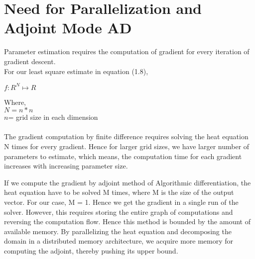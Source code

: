 \documentclass[10pt,a4paper]{report}
\begin{document}
\section{Need for Parallelization and Adjoint Mode AD}
Parameter estimation requires the computation of gradient for every iteration of gradient descent.\\
For our least square estimate in equation (1.8),\\
\begin{center}
$f: R^N\mapsto R$\\
\end{center}
Where,\\
$N =n\ast n$\\
$n$= grid size in each dimension \\
\\
The gradient computation by finite difference requires solving the heat equation N times for every gradient. Hence for larger grid sizes, we have larger number of parameters to estimate, which means, the computation time for each gradient increases with increasing parameter size.

If we compute the gradient by adjoint method of Algorithmic differentiation, the heat equation have to be solved M times, where M is the size of the output vector. For our case, M = 1. Hence we get the gradient in a single run of the solver. However, this requires storing the entire graph of computations and reversing the computation flow. Hence this method is bounded by the amount of available memory. By parallelizing the heat equation and decomposing the domain in a distributed memory architecture, we acquire more memory for computing the adjoint, thereby pushing its upper bound. 
\end{document}
